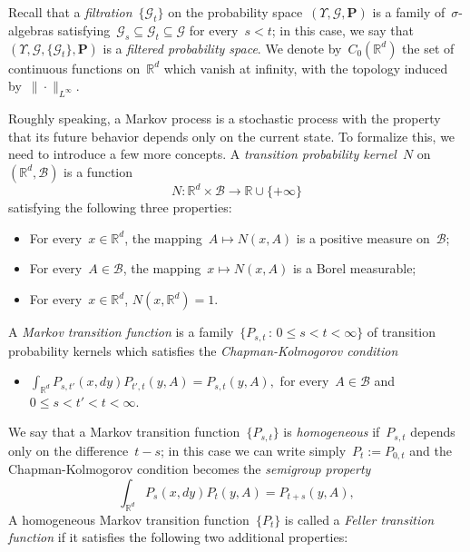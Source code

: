\documentclass[11pt]{article} %
\numberwithin{equation}{section}
\theoremstyle{definition}
\newcommand*{\R}{\ensuremath{\mathbb{R}}}
\newcommand*{\Rd}{\ensuremath{\mathbb{R}^d}}
\begin{document}
Recall that a \emph{filtration}~$\{ \mathcal{G}_t \}$
on the probability space~$(\Upsilon, \mathcal{G}, \mathbf{P})$
is a family of~$\sigma$-algebras satisfying~$\mathcal{G}_s \subseteq \mathcal{G}_t \subseteq \mathcal{G}$ for every~$s<t$; in this case, we say that~$(\Upsilon, \mathcal{G}, \{ \mathcal{G}_t \},\mathbf{P})$ is a \emph{filtered probability space}. 
We denote by~$C_0(\Rd)$ the set of continuous functions on~$\Rd$ which vanish at infinity, with the topology induced by~$\| \cdot \|_{L^\infty}$. 

\smallskip

Roughly speaking, a Markov process is a stochastic process with the property that its future behavior depends only on the current state. 
To formalize this, we need to introduce a few more concepts. 
A \emph{transition probability kernel}~$N$ on~$(\Rd,\mathscr{B})$ is a function 
\begin{equation*}
N:\Rd \times \mathscr{B} \to \R \cup \{ +\infty\}
\end{equation*}
satisfying the following three properties:
\begin{itemize}
\item For every~$x	\in \Rd$, the mapping~$A \mapsto N(x,A)$ is a positive measure on~$\mathscr{B}$;

\item For every~$A \in \mathscr{B}$, the mapping~$x \mapsto N(x,A)$ is a Borel measurable;

\item For every~$x	\in \Rd$, $N(x,\Rd) =1$. 
\end{itemize}
A \emph{Markov transition function} is a family~$\{ P_{s,t}\,:\, 0 \leq s < t < \infty \}$ of transition probability kernels which satisfies the \emph{Chapman-Kolmogorov condition}
\begin{itemize} 

\item 
$\displaystyle\int_{\Rd} P_{s,t'}(x,dy) P_{t',t} (y,A) 
=
P_{s,t} (y,A),$
for every~$A \in \mathscr{B}$ and $0\leq s < t' < t < \infty$.
\end{itemize}
We say that a Markov transition function~$\{ P_{s,t} \}$ is \emph{homogeneous} if~$P_{s,t}$ depends only on the difference~$t-s$; in this case we can write simply~$P_t:= P_{0,t}$ and the Chapman-Kolmogorov condition becomes the \emph{semigroup property}
\begin{equation*}
\int_{\Rd} P_{s}(x,dy) P_{t} (y,A) 
=
P_{t+s} (y,A),
\end{equation*}
A homogeneous Markov transition function~$\{ P_t \}$ is called a \emph{Feller transition function} if it satisfies the following two additional properties: 
\end{document}
